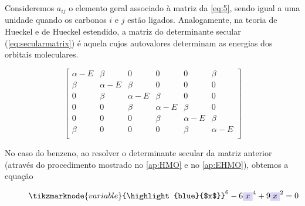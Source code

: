 \noindent Consideremos $a_{ij}$ o elemento geral associado à matriz da \autoref{eq:5}, sendo igual a uma unidade quando os carbonos $i$ e $j$ estão ligados. Analogamente, na teoria de Hueckel e de Hueckel estendido, a matriz do determinante secular (\autoref{eq:secularmatrix}) é aquela cujos autovalores determinam as energias dos orbitais moleculares.

\begin{figure}[htb]
\vspace{0.8\baselineskip}
\begin{equation}
\label{eq:secularmatrix}
\begin{bmatrix}
    \alpha - E & \beta & 0 & 0 & 0 & \beta \\
    \beta & \alpha - E & \beta & 0 & 0 & 0 \\
    0 & \beta & \alpha - E & \beta & 0 & 0 \\
    0 & 0 & \beta & \alpha - E & \beta & 0 \\
    0 & 0 & 0 & \beta & \alpha - E & \beta \\
    \beta & 0 & 0 & 0 & \beta & \alpha - E \\
\end{bmatrix}
\end{equation}
\end{figure}

No caso do benzeno, ao resolver o determinante secular da matriz anterior (através do procedimento mostrado no \autoref{ap:HMO} e no \autoref{ap:EHMO}), obtemos a equação

\begin{figure}[htb]
\begin{equation}
    \label{eq:R3}
    \tikzmarknode{variable}{\highlight{blue}{$x$}}^6 - 6\highlight{blue}{$x$}^4 + 9\highlight{blue}{$x$}^2 = 0
\end{equation}
\vspace{2\baselineskip}
\end{figure}

